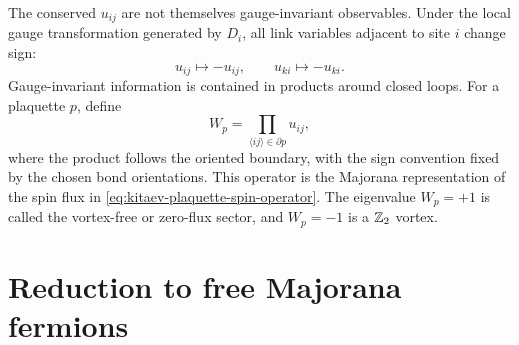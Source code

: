 The conserved \(u_{ij}\) are not themselves gauge-invariant observables.  Under
the local gauge transformation generated by \(D_i\), all link variables adjacent
to site \(i\) change sign:
\begin{equation}
\label{eq:kitaev-link-gauge-transformation}
    u_{ij}\longmapsto -u_{ij},
    \qquad
    u_{ki}\longmapsto -u_{ki} .
\end{equation}
Gauge-invariant information is contained in products around closed loops.  For a
plaquette \(p\), define
\begin{equation}
\label{eq:kitaev-majorana-flux}
    W_p
    =
    \prod_{\langle ij\rangle\in\partial p} u_{ij},
\end{equation}
where the product follows the oriented boundary, with the sign convention fixed
by the chosen bond orientations.  This operator is the Majorana representation
of the spin flux in \cref{eq:kitaev-plaquette-spin-operator}.  The eigenvalue
\(W_p=+1\) is called the vortex-free or zero-flux sector, and \(W_p=-1\) is a
\(\mathbb{Z}_2\) vortex.

\section{Reduction to free Majorana fermions}
\label{sec:kitaev-free-majorana-reduction}

